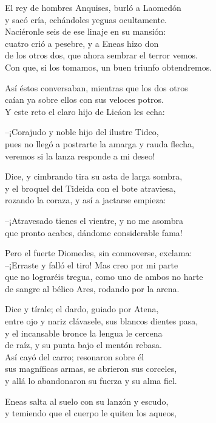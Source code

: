 \documentclass[11pt,twoside]{article}
\begin{document}
El rey de hombres Anquises, burló a Laomedón\\
y sacó cría, echándoles yeguas ocultamente.\\
Naciéronle seis de ese linaje en su mansión:\\
cuatro crió a pesebre, y a Eneas hizo don\\
de los otros dos, que ahora sembrar el terror vemos.\\
Con que, si los tomamos, un buen triunfo obtendremos.\par
Así éstos conversaban, mientras que los dos otros\\
caían ya sobre ellos con sus veloces potros.\\
Y este reto el claro hijo de Licáon les echa:\par
--¡Corajudo y noble hijo del ilustre Tideo,\\
pues no llegó a postrarte la amarga y rauda flecha,\\
veremos si la lanza responde a mi deseo!\par
Dice, y cimbrando tira su asta de larga sombra,\\
y el broquel del Tideida con el bote atraviesa,\\
rozando la coraza, y así a jactarse empieza:\par
--¡Atravesado tienes el vientre, y no me asombra\\
que pronto acabes, dándome considerable fama!\par
Pero el fuerte Diomedes, sin conmoverse, exclama:\\
--¡Erraste y falló el tiro! Mas creo por mi parte\\
que no lograréis tregua, como uno de ambos no harte\\
de sangre al bélico Ares, rodando por la arena.\par
Dice y tírale; el dardo, guiado por Atena,\\
entre ojo y nariz clávasele, sus blancos dientes pasa,\\
y el incansable bronce la lengua le cercena\\
de raíz, y su punta bajo el mentón rebasa.\\
Así cayó del carro; resonaron sobre él\\
sus magníficas armas, se abrieron sus corceles,\\
y allá lo abandonaron su fuerza y su alma fiel.\par
Eneas salta al suelo con su lanzón y escudo,\\
y temiendo que el cuerpo le quiten los aqueos,\\
\end{document}
